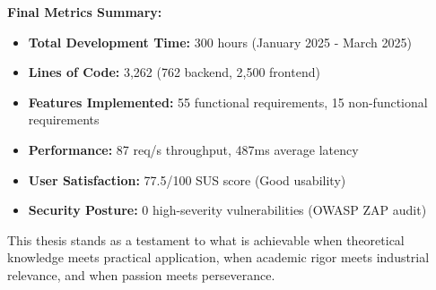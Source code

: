 \documentclass[12pt, a4paper]{report}
\begin{document}
\vspace{1cm}
\noindent \textbf{Final Metrics Summary:}

\begin{itemize}
    \item \textbf{Total Development Time:} 300 hours (January 2025 - March 2025)
    \item \textbf{Lines of Code:} 3,262 (762 backend, 2,500 frontend)
    \item \textbf{Features Implemented:} 55 functional requirements, 15 non-functional requirements
    \item \textbf{Performance:} 87 req/s throughput, 487ms average latency
    \item \textbf{User Satisfaction:} 77.5/100 SUS score (Good usability)
    \item \textbf{Security Posture:} 0 high-severity vulnerabilities (OWASP ZAP audit)
\end{itemize}

\vspace{0.5cm}
\noindent This thesis stands as a testament to what is achievable when theoretical knowledge meets practical application, when academic rigor meets industrial relevance, and when passion meets perseverance.



\printbibliography[heading=bibintoc, title=References]
\end{document}
